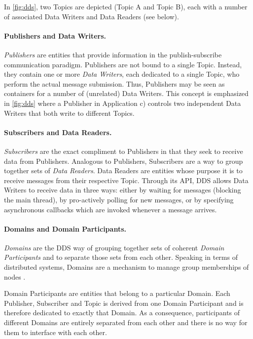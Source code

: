 In \autoref{fig:dds}, two Topics are depicted (Topic A and Topic B), each with a number of associated Data Writers and Data Readers (see below). 

\paragraph{Publishers and Data Writers.}
\emph{Publishers} are entities that provide information in the publish-subscribe communication paradigm. Publishers are not bound to a single Topic. Instead, they contain one or more \emph{Data Writers}, each dedicated to a single Topic, who perform the actual message submission. Thus, Publishers may be seen as containers for a number of (unrelated) Data Writers. This concept is emphasized in \autoref{fig:dds} where a Publisher in Application c) controls two independent Data Writers that both write to different Topics.

\paragraph{Subscribers and Data Readers.}
\emph{Subscribers} are the exact compliment to Publishers in that they seek to receive data from Publishers. Analogous to Publishers, Subscribers are a way to group together sets of \emph{Data Readers}. Data Readers are entities whose purpose it is to receive messages from their respective Topic. Through its API, DDS allows Data Writers to receive data in three ways: either by waiting for messages (blocking the main thread), by pro-actively polling for new messages, or by specifying asynchronous callbacks which are invoked whenever a message arrives.

\paragraph{Domains and Domain Participants.}
\emph{Domains} are the DDS way of grouping together sets of coherent \emph{Domain Participants} and to separate those sets from each other. Speaking in terms of distributed systems, Domains are a mechanism to manage group memberships of nodes \cite{tanenbaum2017distributed}. 

Domain Participants are entities that belong to a particular Domain. Each Publisher, Subscriber and Topic is derived from one Domain Participant and is therefore dedicated to exactly that Domain. As a consequence, participants of different Domains are entirely separated from each other and there is no way for them to interface with each other.

